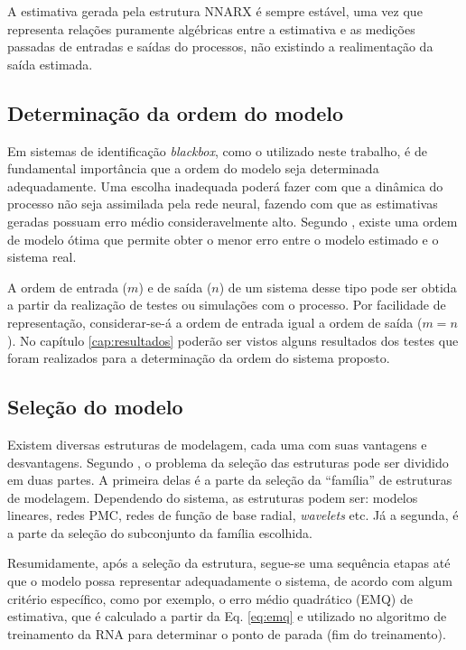 A estimativa gerada pela estrutura NNARX é sempre estável, uma vez que
representa relações puramente algébricas entre a estimativa e as medições
passadas de entradas e saídas do processos, não existindo a realimentação da
saída estimada.

\subsection{Determinação da ordem do modelo}
\label{sec:det_ordem}
Em sistemas de identificação {\it blackbox}, como o utilizado neste trabalho, é
de fundamental importância que a ordem do modelo seja determinada adequadamente.
Uma escolha inadequada poderá fazer com que a dinâmica do processo não seja
assimilada pela rede neural, fazendo com que as estimativas geradas possuam erro
médio consideravelmente alto. Segundo , existe uma ordem
de modelo ótima que permite obter o menor erro entre o modelo estimado e o
sistema real.

A ordem de entrada ($m$) e de saída ($n$) de um sistema desse tipo pode ser
obtida a partir da realização de testes ou simulações com o processo. Por
facilidade de representação, considerar-se-á a ordem de entrada igual a ordem de
saída ($m = n$). No capítulo \ref{cap:resultados} poderão ser vistos alguns
resultados dos testes que foram realizados para a determinação da ordem do
sistema proposto.

\subsection{Seleção do modelo}
Existem diversas estruturas de modelagem, cada uma com suas vantagens e
desvantagens. Segundo , o problema da seleção das
estruturas pode ser dividido em duas partes. A primeira delas é a parte da
seleção da ``família'' de estruturas de modelagem. Dependendo do sistema, as
estruturas podem ser: modelos lineares, redes PMC, redes de função de base
radial, {\it wavelets} etc. Já a segunda, é a parte da seleção do subconjunto da
família escolhida.

Resumidamente, após a seleção da estrutura, segue-se uma sequência etapas até
que o modelo possa representar adequadamente o sistema, de acordo com algum
critério específico, como por exemplo, o erro médio quadrático (EMQ) de
estimativa, que é calculado a partir da Eq. \ref{eq:emq} e utilizado no
algoritmo de treinamento da RNA para determinar o ponto de parada (fim do
treinamento).

